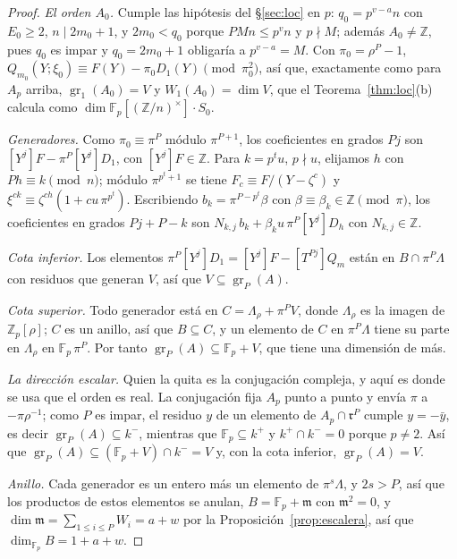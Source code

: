 \documentclass[11pt,a4paper]{article}
\theoremstyle{definition}
\newcommand{\ZZ}{\mathbb{Z}}
\newcommand{\FF}{\mathbb{F}}
\newcommand{\rad}{\mathfrak{r}}
\newcommand{\gr}{\operatorname{gr}}
\begin{document}
\begin{proof}
\emph{El orden $A_0$.} Cumple las hipótesis del \S\ref{sec:loc} en $p$: $q_0=p^{v-a}n$ con $E_0\ge2$, $n\mid2m_0+1$,
y $2m_0<q_0$ porque $PMn\le p^vn$ y $p\nmid M$; además $A_0\ne\ZZ$, pues $q_0$ es impar y
$q_0=2m_0+1$ obligaría a $p^{v-a}=M$. Con $\pi_0=\rho^P-1$, $Q_{m_0}(Y;\xi_0)\equiv F(Y)-\pi_0D_1(Y)
\pmod{\pi_0^2}$, así que, exactamente como para $A_p$ arriba, $\gr_1(A_0)=V$ y $W_1(A_0)=\dim V$, que el
Teorema~\ref{thm:loc}(b) calcula como $\dim\FF_p[(\ZZ/n)^\times]\cdot S_0$.

\emph{Generadores.} Como $\pi_0\equiv\pi^P$ módulo $\pi^{P+1}$, los coeficientes en grados $Pj$ son
$[Y^j]F-\pi^P[Y^j]D_1$, con $[Y^j]F\in\ZZ$. Para $k=p^tu$, $p\nmid u$, elijamos $h$ con $Ph\equiv k\pmod n$; módulo
$\pi^{p^t+1}$ se tiene $F_c\equiv F/(Y-\zeta^c)$ y $\xi^{ck}\equiv\zeta^{ch}(1+cu\,\pi^{p^t})$. Escribiendo
$b_k=\pi^{P-p^t}\beta$ con $\beta\equiv\beta_k\in\ZZ\pmod\pi$, los coeficientes en grados $Pj+P-k$ son
$N_{k,j}\,b_k+\beta_ku\,\pi^P[Y^j]D_h$ con $N_{k,j}\in\ZZ$.

\emph{Cota inferior.} Los elementos $\pi^P[Y^j]D_1=[Y^j]F-[T^{Pj}]Q_m$ están en $B\cap\pi^P\Lambda$ con residuos que
generan $V$, así que $V\subseteq\gr_P(A)$.

\emph{Cota superior.} Todo generador está en $C=\Lambda_\rho+\pi^PV$, donde $\Lambda_\rho$ es la
imagen de $\ZZ_p[\rho]$; $C$ es un anillo, así que $B\subseteq C$, y un elemento de $C$ en $\pi^P\Lambda$ tiene su parte en
$\Lambda_\rho$ en $\FF_p\,\pi^P$. Por tanto $\gr_P(A)\subseteq\FF_p+V$, que tiene una dimensión de más.

\emph{La dirección escalar.} Quien la quita es la conjugación compleja, y aquí es donde se usa que el orden es real.
La conjugación fija $A_p$ punto a punto y envía $\pi$ a $-\pi\rho^{-1}$; como $P$ es impar, el residuo $y$ de un
elemento de $A_p\cap\rad^P$ cumple $y=-\bar y$, es decir $\gr_P(A)\subseteq k^-$, mientras que $\FF_p\subseteq k^+$ y
$k^+\cap k^-=0$ porque $p\neq2$. Así que $\gr_P(A)\subseteq(\FF_p+V)\cap k^-=V$ y, con la cota inferior,
$\gr_P(A)=V$.

\emph{Anillo.} Cada generador es un entero más un elemento de $\pi^s\Lambda$, y $2s>P$, así que los productos de estos
elementos se anulan, $B=\FF_p+\mathfrak m$ con $\mathfrak m^2=0$, y $\dim\mathfrak m=\sum_{1\le i\le P}W_i=a+w$ por
la Proposición~\ref{prop:escalera}, así que $\dim_{\FF_p}B=1+a+w$.
\end{proof}
\end{document}
